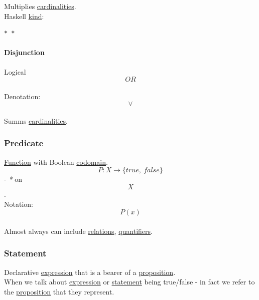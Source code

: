 \documentclass[11pt]{article}
\begin{document}
Multiplies \hyperref[org55a87c3]{cardinalities}.\\

Haskell \hyperref[orgd0eb143]{kind}:\\
\begin{verbatim}
* *
\end{verbatim}

\paragraph{\label{org3588607}Disjunction}
\label{sec:org6f412cc}
Logical $$ OR $$\\
Denotation:\\
$$ \lor $$\\

Summs \hyperref[org55a87c3]{cardinalities}.\\

\subsubsection{\label{orgec7f705}Predicate}
\label{sec:org9653606}
\hyperref[orge15bc14]{Function} with Boolean \hyperref[org410079d]{codomain}.\\
$$ P: X \to \{ true, \ false \} $$ - \emph{*} on $$ X $$.\\

Notation: $$ P(x) $$\\

Almost always can include \hyperref[org711476e]{relations}, \hyperref[org56c9794]{quantifiers}.\\

\subsubsection{\label{org36313c0}Statement}
\label{sec:orgb27a7fe}
Declarative \hyperref[org9021dd7]{expression} that is a bearer of a \hyperref[org1e068ed]{proposition}.\\

When we talk about \hyperref[org9021dd7]{expression} or \hyperref[org36313c0]{statement} being true/false - in fact we refer to the \hyperref[org1e068ed]{proposition} that they represent.\\
\end{document}
